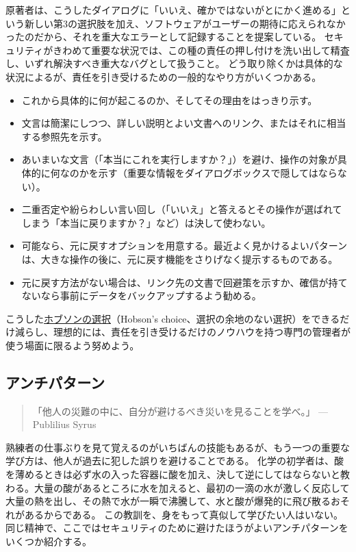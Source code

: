 \documentclass[uplatex]{jsarticle}
\begin{document}
\begin{rem}
原著者は、こうしたダイアログに「いいえ、確かではないがとにかく進める」という新しい第3の選択肢を加え、ソフトウェアがユーザーの期待に応えられなかったのだから、それを重大なエラーとして記録することを提案している。
セキュリティがきわめて重要な状況では、この種の責任の押し付けを洗い出して精査し、いずれ解決すべき重大なバグとして扱うこと。
どう取り除くかは具体的な状況によるが、責任を引き受けるための一般的なやり方がいくつかある。
\begin{itemize}
\item これから具体的に何が起こるのか、そしてその理由をはっきり示す。
\item 文言は簡潔にしつつ、詳しい説明とよい文書へのリンク、またはそれに相当する参照先を示す。
\item あいまいな文言（「本当にこれを実行しますか？」）を避け、操作の対象が具体的に何なのかを示す（重要な情報をダイアログボックスで隠してはならない）。
\item 二重否定や紛らわしい言い回し（「いいえ」と答えるとその操作が選ばれてしまう「本当に戻りますか？」など）は決して使わない。
\item 可能なら、元に戻すオプションを用意する。最近よく見かけるよいパターンは、大きな操作の後に、元に戻す機能をさりげなく提示するものである。
\item 元に戻す方法がない場合は、リンク先の文書で回避策を示すか、確信が持てないなら事前にデータをバックアップするよう勧める。
\end{itemize}
こうした\underline{ホブソンの選択}（Hobson's choice、選択の余地のない選択）をできるだけ減らし、理想的には、責任を引き受けるだけのノウハウを持つ専門の管理者が使う場面に限るよう努めよう。
\end{rem}

\subsection{アンチパターン}

\begin{quote}
「他人の災難の中に、自分が避けるべき災いを見ることを学べ。」 ---Publilius Syrus
\end{quote}

熟練者の仕事ぶりを見て覚えるのがいちばんの技能もあるが、もう一つの重要な学び方は、他人が過去に犯した誤りを避けることである。
化学の初学者は、酸を薄めるときは必ず水の入った容器に酸を加え、決して逆にしてはならないと教わる。大量の酸があるところに水を加えると、最初の一滴の水が激しく反応して大量の熱を出し、その熱で水が一瞬で沸騰して、水と酸が爆発的に飛び散るおそれがあるからである。
この教訓を、身をもって真似して学びたい人はいない。同じ精神で、ここではセキュリティのために避けたほうがよいアンチパターンをいくつか紹介する。
\end{document}
